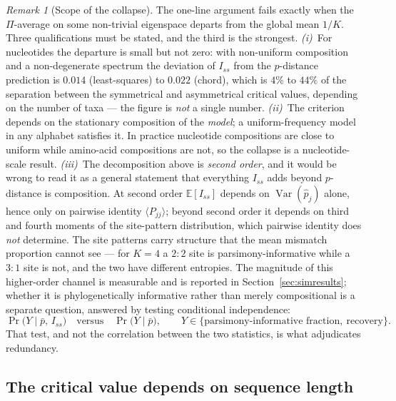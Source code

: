 \documentclass[11pt]{article}
\newcommand{\Iss}{I_{ss}}
\newcommand{\E}{\mathbb{E}}
\newcommand{\Var}{\operatorname{Var}}
\theoremstyle{definition}
\theoremstyle{remark}
\newtheorem{remark}[theorem]{Remark}
\begin{document}
\begin{remark}[Scope of the collapse]
\label{rem:scope}
The one-line argument fails exactly when the $\Pi$-average on some non-trivial
eigenspace departs from the global mean $1/K$. Three qualifications must be
stated, and the third is the strongest.
\emph{(i)}~For nucleotides the departure is small but not zero: with
non-uniform composition and a non-degenerate spectrum the deviation of $\Iss$
from the $p$-distance prediction is $0.014$ (least-squares) to $0.022$ (chord),
which is $4\%$ to $44\%$ of the separation between the symmetrical and
asymmetrical critical values, depending on the number of taxa --- the figure is
\emph{not} a single number.
\emph{(ii)}~The criterion depends on the stationary composition of the
\emph{model}; a uniform-frequency model in any alphabet satisfies it. In
practice nucleotide compositions are close to uniform while amino-acid
compositions are not, so the collapse is a nucleotide-scale result.
\emph{(iii)}~The decomposition above is \emph{second order}, and it would be
wrong to read it as a general statement that everything $\Iss$ adds beyond
$p$-distance is composition. At second order $\E[\Iss]$ depends on
$\Var(\hat p_j)$ alone, hence only on pairwise identity
$\langle P_{jj}\rangle$; beyond second order it depends on third and fourth
moments of the site-pattern distribution, which pairwise identity does \emph{not}
determine. The site patterns carry structure that the mean mismatch proportion
cannot see --- for $K=4$ a $2\!:\!2$ site is parsimony-informative while a
$3\!:\!1$ site is not, and the two have different entropies. The magnitude of
this higher-order channel is measurable and is reported in
Section~\ref{sec:simresults}; whether it is phylogenetically informative rather
than merely compositional is a separate question, answered by testing
conditional independence:
\begin{equation}
  \Pr\bigl(Y \mid \bar p,\, \Iss\bigr)\quad\text{versus}\quad
  \Pr\bigl(Y \mid \bar p\bigr),
  \qquad Y\in\{\text{parsimony-informative fraction},\ \text{recovery}\}.
  \label{eq:condindep}
\end{equation}
That test, and not the correlation between the two statistics, is what
adjudicates redundancy.
\end{remark}

\subsection{The critical value depends on sequence length}
\end{document}
